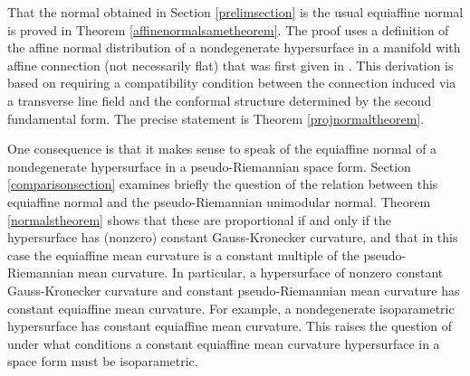 \documentclass [leqno, 10pt]{amsart}
\theoremstyle{definition}
\numberwithin{equation}{section}
\begin{document}
That the normal obtained in Section \ref{prelimsection} is the usual equiaffine normal is proved in Theorem \ref{affinenormalsametheorem}. The proof uses a definition of the affine normal distribution of a nondegenerate hypersurface in a manifold with affine connection (not necessarily flat) that was first given in \cite{Fox-ahs}. This derivation is based on requiring a compatibility condition between the connection induced via a transverse line field and the conformal structure determined by the second fundamental form. The precise statement is Theorem \ref{projnormaltheorem}.

One consequence is that it makes sense to speak of the equiaffine normal of a nondegenerate hypersurface in a pseudo-Riemannian space form. Section \ref{comparisonsection} examines briefly the question of the relation between this equiaffine normal and the pseudo-Riemannian unimodular normal. Theorem \ref{normalstheorem} shows that these are proportional if and only if the hypersurface has (nonzero) constant Gauss-Kronecker curvature, and that in this case the equiaffine mean curvature is a constant multiple of the pseudo-Riemannian mean curvature. In particular, a hypersurface of nonzero constant Gauss-Kronecker curvature and constant pseudo-Riemannian mean curvature has constant equiaffine mean curvature. For example, a nondegenerate isoparametric hypersurface has constant equiaffine mean curvature. This raises the question of under what conditions a constant equiaffine mean curvature hypersurface in a space form must be isoparametric.
\end{document}
